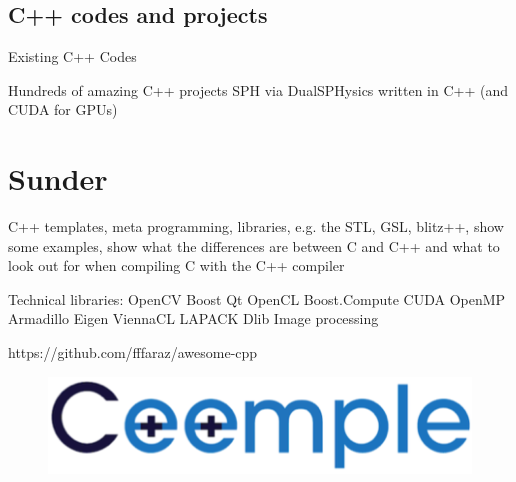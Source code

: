 \documentclass[compress]{beamer}
\begin{document}
\subsection{C++ codes and projects}
\begin{frame}{Existing C++ Codes}
\begin{exampleblock}{Hundreds of amazing C++ projects}
SPH via DualSPHysics written in C++ (and CUDA for GPUs)
\end{exampleblock}
	\begin{figure}[h!]
	\end{figure}
\end{frame}



\section{Sunder}

\begin{frame}
C++ templates, meta programming, libraries, e.g. the STL, GSL, blitz++, show some examples, show what the differences are between C and C++ and what to look out for when compiling C with the C++ compiler
\end{frame}

\begin{frame}
	Technical libraries:
	OpenCV
	Boost
	Qt
	OpenCL
	Boost.Compute
	CUDA
	OpenMP
	Armadillo
	Eigen
	ViennaCL
	LAPACK
	Dlib
	Image processing
	
	https://github.com/fffaraz/awesome-cpp
	
\end{frame}

\begin{frame}
	\begin{figure}
		\centering
		\includegraphics[width=0.8\linewidth]{figures/Ceemple.png}
	\end{figure}
\end{frame}



%
%
\end{document}
